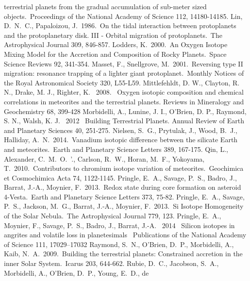 \documentclass[preprint,5p,times,authoryear]{elsarticle}
\begin{document}
\begin{thebibliography}{}
terrestrial planets from the gradual accumulation of sub-meter sized objects.\ Proceedings of the National Academy of Science 112, 
14180-14185.
 Lin, D.~N.~C., Papaloizou, J.\ 1986.\ On the tidal interaction between 
protoplanets and the protoplanetary disk. III - Orbital migration of protoplanets.\ The Astrophysical Journal 309, 846-857.
 Lodders, K.\ 2000.\ An Oxygen Isotope Mixing Model for the Accretion and Composition of 
Rocky Planets.\ Space Science Reviews 92, 341-354.
 Masset, F., Snellgrove, M.\ 2001.\ Reversing type II migration: 
resonance trapping of a lighter giant protoplanet.\ Monthly Notices of the Royal Astronomical Society 320, L55-L59.
 Mittlefehldt, D. W., Clayton, R. N., Drake, M. J., Righter, K. \ 2008. \ Oxygen isotopic 
composition and chemical correlations in meteorites and the terrestrial planets. Reviews in Mineralogy and Geochemistry 68, 399-428
 Morbidelli, A., Lunine, J. I., O'Brien, D. P., Raymond, S. N., Walsh, K. J. \ 2012 \ 
Building Terrestrial Planets. Annual Review of Earth and Planetary Sciences 40, 251-275.
\bibitem[Nielsen et al.(2014)]{N14} Nielsen, S.~G., Prytulak, J., Wood, B.~J., Halliday, A.~N.\ 2014.\ Vanadium 
isotopic difference between the silicate Earth and meteorites.\ Earth and Planetary Science Letters 389, 167-175.
\bibitem[Qin et al.(2010)]{Q10} Qin, L., Alexander, C.~M.~O.~'., Carlson, R.~W., Horan, M.~F., Yokoyama, T.\ 2010.\ 
Contributors to chromium isotope variation of meteorites.\ Geochimica et Cosmochimica Acta 74, 1122-1145.
\bibitem[Pringle et al.(2013a)]{P13a} Pringle, E.~A., Savage, P.~S., Badro, J., Barrat, J.-A., Moynier, F.\ 2013.\ Redox 
state during core formation on asteroid 4-Vesta.\ Earth and Planetary Science Letters 373, 75-82. 
\bibitem[Pringle et al.(2013b)]{P13b} Pringle, E.~A., Savage, P.~S., Jackson, M.~G., Barrat, J.-A., Moynier, F.\ 
 2013.\ Si Isotope Homogeneity of the Solar Nebula.\ The Astrophysical Journal 779, 123.
\bibitem[Pringle et al.(2014)]{P14} Pringle, E.~A., Moynier, F., Savage, P.~S., Badro, J., Barrat, J.-A. \ 2014 \
Silicon isotopes in angrites and volatile loss in planetesimals \ Publications of the National Academy of Science 111, 17029–17032
\bibitem[Raymond et al.(2009)]{R09} Raymond, S.~N., O'Brien, D.~P., Morbidelli, A., Kaib, N.~A.\ 2009.\ Building the 
terrestrial planets: Constrained accretion in the inner Solar System.\ Icarus 203, 644-662.
\bibitem[Rubie et al.(2015)]{R15} Rubie, D.~C., Jacobson, S.~A., Morbidelli, A., O'Brien, D.~P., Young, E.~D., de 

\end{thebibliography}
\end{document}
